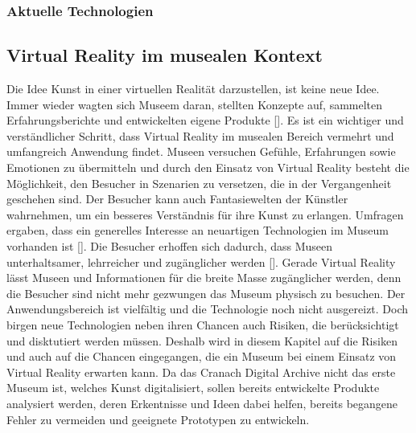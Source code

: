 \documentclass[a4paper,12pt,oneside]{article}
\begin{document}
        \subsubsection{Aktuelle Technologien}
        
    \subsection{Virtual Reality im musealen Kontext}
      Die Idee Kunst in einer virtuellen Realität darzustellen, ist keine neue Idee.
      Immer wieder wagten sich Museem daran, stellten Konzepte auf, sammelten
      Erfahrungsberichte und entwickelten eigene Produkte [\cite{Heidsiek2019}]. Es ist
      ein wichtiger und verständlicher Schritt, dass Virtual Reality
      im musealen Bereich vermehrt und umfangreich Anwendung findet. Museen versuchen Gefühle,
      Erfahrungen sowie Emotionen zu übermitteln und durch den Einsatz von Virtual Reality
      besteht die Möglichkeit, den Besucher in Szenarien zu versetzen, die in der
      Vergangenheit geschehen sind. Der Besucher kann auch Fantasiewelten der Künstler
      wahrnehmen, um ein besseres Verständnis für ihre Kunst zu erlangen. Umfragen ergaben, 
      dass ein generelles Interesse an neuartigen Technologien im Museum vorhanden ist [\cite[34]{Heidsiek2019}].
      Die Besucher erhoffen sich dadurch, dass Museen unterhaltsamer, lehrreicher und
      zugänglicher werden [\cite[34]{Heidsiek2019}]. Gerade Virtual Reality lässt Museen
      und Informationen für die breite Masse zugänglicher werden, denn die Besucher 
      sind nicht mehr gezwungen 
      das Museum physisch zu besuchen. Der Anwendungsbereich ist vielfältig und die 
      Technologie noch nicht ausgereizt.
      Doch birgen neue Technologien neben ihren Chancen auch Risiken, die berücksichtigt
      und disktutiert werden müssen. Deshalb wird in diesem Kapitel auf die
      Risiken und auch auf die Chancen eingegangen, die ein Museum bei einem Einsatz von
      Virtual Reality erwarten kann. Da das Cranach Digital Archive nicht das erste Museum ist, 
      welches Kunst digitalisiert, sollen bereits entwickelte Produkte analysiert
      werden, deren Erkentnisse und Ideen dabei helfen, bereits begangene Fehler zu 
      vermeiden und geeignete Prototypen zu entwickeln.
\end{document}
